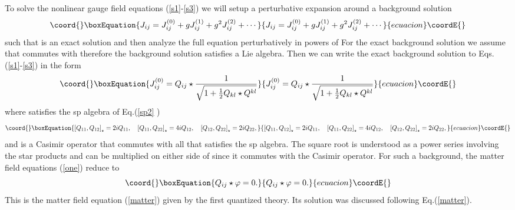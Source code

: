 \documentclass[a4paper,12pt]{article}
\begin{document}
To solve the nonlinear gauge field equations (\ref{s1}-\ref{s3}) we will
setup a perturbative expansion around a background solution 
\begin{equation}\coord{}\boxEquation{
J_{ij}=J_{ij}^{\left( 0\right) }+gJ_{ij}^{\left( 1\right)
}+g^{2}J_{ij}^{\left( 2\right) }+\cdots
}{
J_{ij}=J_{ij}^{\left( 0\right) }+gJ_{ij}^{\left( 1\right)
}+g^{2}J_{ij}^{\left( 2\right) }+\cdots
}{ecuacion}\coordE{}\end{equation}
such that \coordHE{} is an exact solution and then analyze
the full equation perturbatively in powers of \coordHE{} For the exact background
solution we assume that \coordHE{}
commutes with \coordHE{} therefore the background solution
satisfies a Lie algebra. Then we can write the exact background solution to
Eqs.(\ref{s1}-\ref{s3}) in the form 
\begin{equation}\coord{}\boxEquation{
J_{ij}^{\left( 0\right) }=Q_{ij}\star \frac{1}{\sqrt{1+\frac{1}{2}
Q_{kl}\star Q^{kl}}}  \label{JQ}
}{
J_{ij}^{\left( 0\right) }=Q_{ij}\star \frac{1}{\sqrt{1+\frac{1}{2}
Q_{kl}\star Q^{kl}}}  }{ecuacion}\coordE{}\end{equation}
where \coordHE{} satisfies the sp\coordHE{} algebra of Eq.(\ref{sp2}%
) 
\begin{equation}\coord{}\boxEquation{
\left[ Q_{11},Q_{12}\right] _{\star }=2iQ_{11},\quad \left[ Q_{11},Q_{22}
\right] _{\star }=4iQ_{12},\quad \left[ Q_{12},Q_{22}\right] _{\star
}=2iQ_{22},  \label{Qalg}
}{
\left[ Q_{11},Q_{12}\right] _{\star }=2iQ_{11},\quad \left[ Q_{11},Q_{22}
\right] _{\star }=4iQ_{12},\quad \left[ Q_{12},Q_{22}\right] _{\star
}=2iQ_{22},  }{ecuacion}\coordE{}\end{equation}
and \coordHE{} is a Casimir operator that commutes with
all \coordHE{} that satisfies the sp\coordHE{} algebra. The square
root is understood as a power series involving the star products and can be
multiplied on either side of \coordHE{} since it commutes with the Casimir
operator. For such a background, the matter field equations (\ref{one})
reduce to 
\begin{equation}\coord{}\boxEquation{
Q_{ij}\star \varphi =0.  \label{Qphi}
}{
Q_{ij}\star \varphi =0.  }{ecuacion}\coordE{}\end{equation}
This is the matter field equation (\ref{matter}) given by the first
quantized theory. Its solution was discussed following Eq.(\ref{matter}).
\end{document}
